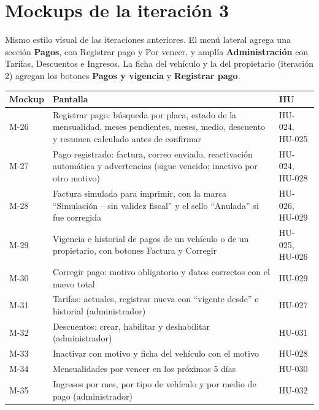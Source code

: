 \section{Mockups de la iteración 3}


Mismo estilo visual de las iteraciones anteriores. El menú lateral agrega una sección \textbf{Pagos}, con Registrar pago y Por vencer, y amplía \textbf{Administración} con Tarifas, Descuentos e Ingresos. La ficha del vehículo y la del propietario (iteración 2) agregan los botones \textbf{Pagos y vigencia} y \textbf{Registrar pago}.


\begin{longtable}{>{\raggedright\arraybackslash}p{1.5cm}>{\raggedright\arraybackslash}p{11.4cm}>{\raggedright\arraybackslash}p{1.5cm}}
\toprule
\textbf{Mockup} & \textbf{Pantalla} & \textbf{HU}\\
\midrule\endhead
M-26 & Registrar pago: búsqueda por placa, estado de la mensualidad, meses pendientes, meses, medio, descuento y resumen calculado antes de confirmar & HU-024, HU-025\\
M-27 & Pago registrado: factura, correo enviado, reactivación automática y advertencias (sigue vencido; inactivo por otro motivo) & HU-024, HU-028\\
M-28 & Factura simulada para imprimir, con la marca ``Simulación – sin validez fiscal'' y el sello ``Anulada'' si fue corregida & HU-026, HU-029\\
M-29 & Vigencia e historial de pagos de un vehículo o de un propietario, con botones Factura y Corregir & HU-025, HU-026\\
M-30 & Corregir pago: motivo obligatorio y datos correctos con el nuevo total & HU-029\\
M-31 & Tarifas: actuales, registrar nueva con ``vigente desde'' e historial (administrador) & HU-027\\
M-32 & Descuentos: crear, habilitar y deshabilitar (administrador) & HU-031\\
M-33 & Inactivar con motivo y ficha del vehículo con el motivo & HU-028\\
M-34 & Mensualidades por vencer en los próximos 5 días & HU-030\\
M-35 & Ingresos por mes, por tipo de vehículo y por medio de pago (administrador) & HU-032\\
\bottomrule
\end{longtable}




